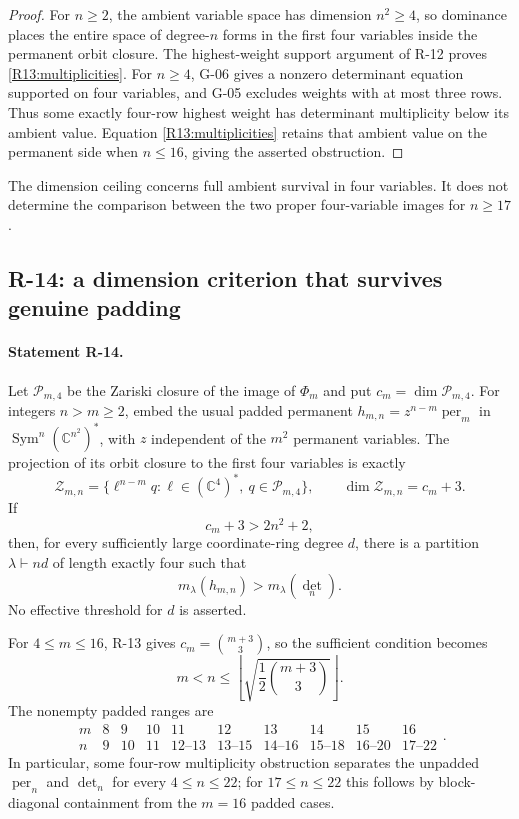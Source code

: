 \begin{proof}
For $n\geq2$, the ambient variable space has dimension $n^2\geq4$,
so dominance places the entire space of degree-$n$ forms in the
first four variables inside the permanent orbit closure. The
highest-weight support argument of R-12 proves
\eqref{R13:multiplicities}.
For $n\geq4$, G-06 gives a nonzero determinant equation supported
on four variables, and G-05 excludes weights with at most three
rows. Thus some exactly four-row highest weight has determinant
multiplicity below its ambient value. Equation
\eqref{R13:multiplicities} retains that ambient value on the
permanent side when $n\leq16$, giving the asserted obstruction.
\end{proof}

The dimension ceiling concerns full ambient survival in four
variables. It does not determine the comparison between the two
proper four-variable images for $n\geq17$.

\subsection{R-14: a dimension criterion that survives genuine padding}

\paragraph{Statement R-14.}
Let $\mathcal P_{m,4}$ be the Zariski closure of the image of
$\Phi_m$ and put $c_m=\dim\mathcal P_{m,4}$.
For integers $n>m\geq2$, embed the usual padded permanent
$h_{m,n}=z^{n-m}\operatorname{per}_m$ in
$\operatorname{Sym}^n(\mathbb C^{n^2})^*$, with $z$ independent
of the $m^2$ permanent variables. The projection of its orbit
closure to the first four variables is exactly
\begin{equation}\label{R14:paddingvariety}
 \mathcal Z_{m,n}=
 \{\ell^{n-m}q:\ell\in(\mathbb C^4)^*,\ q\in\mathcal P_{m,4}\},
 \qquad \dim\mathcal Z_{m,n}=c_m+3.
\end{equation}
If
\begin{equation}\label{R14:criterion}
 c_m+3>2n^2+2,
\end{equation}
then, for every sufficiently large coordinate-ring degree $d$,
there is a partition $\lambda\vdash nd$ of length exactly four
such that
\[
 m_\lambda(h_{m,n})>m_\lambda(\det_n).
\]
No effective threshold for $d$ is asserted.

For $4\leq m\leq16$, R-13 gives $c_m=\binom{m+3}{3}$, so the
sufficient condition becomes
\begin{equation}\label{R14:explicitrange}
 m<n\leq\left\lfloor\sqrt{\frac12\binom{m+3}{3}}\right\rfloor.
\end{equation}
The nonempty padded ranges are
\[
\begin{array}{c|ccccccccc}
m&8&9&10&11&12&13&14&15&16\\\hline
n&9&10&11&12\text{--}13&13\text{--}15&14\text{--}16&
15\text{--}18&16\text{--}20&17\text{--}22
\end{array}.
\]
In particular, some four-row multiplicity obstruction separates
the unpadded $\operatorname{per}_n$ and $\det_n$ for every
$4\leq n\leq22$; for $17\leq n\leq22$ this follows by
block-diagonal containment from the $m=16$ padded cases.

